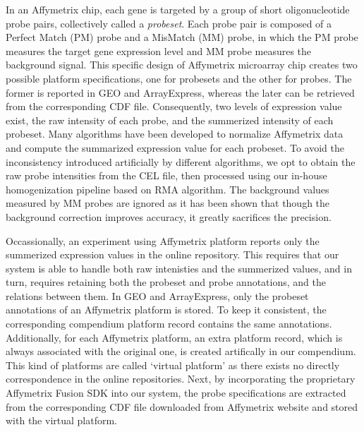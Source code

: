In an Affymetrix chip, each gene is targeted by a group of short
oligonucleotide probe pairs, collectively called a \textit{probeset}.
%
Each probe pair is composed of a Perfect Match (PM) probe and a MisMatch
(MM) probe, in which the PM probe measures the target gene expression
level and MM probe measures the background signal.
%
This specific design of Affymetrix microarray chip creates two possible
platform specifications, one for probesets and the other for probes.
%
The former is reported in GEO and ArrayExpress, whereas the later can be
retrieved from the corresponding CDF file.
%
Consequently, two levels of expression value exist, the raw intensity of
each probe, and the summerized intensity of each probeset.
%
Many algorithms \cite{Irizarry2003, Li2001, Hubbell2002} have been developed to
normalize Affymetrix data and compute the summarized expression value for each
probeset.
%
To avoid the inconsistency introduced artificially by different algorithms, we
opt to obtain the raw probe intensities from the CEL file, then processed
using our in-house homogenization pipeline based on RMA algorithm.
%
%
The background values measured by MM probes are ignored as it has been shown
that though the background correction improves accuracy, it greatly sacrifices
the precision\cite{Irizarry2006}.


Occassionally, an experiment using Affymetrix platform reports only the
summerized expression values in the online repository.
%
This requires that our system is able to handle both raw intenisties and the
summerized values, and in turn, requires retaining both the probeset and probe
annotations, and the relations between them.
%
In GEO and ArrayExpress, only the probeset annotations of an Affymetrix
platform is stored.
%
To keep it consistent, the corresponding compendium platform record contains
the same annotations.
%
Additionally, for each Affymetrix platform, an extra platform record, which is
always associated with the original one, is created artifically in our
compendium.
%
This kind of platforms are called `virtual platform' as there exists no
directly correspondence in the online repositories.
%
Next, by incorporating the proprietary Affymetrix Fusion SDK into our system,
the probe specifications are extracted from the corresponding CDF file
downloaded from Affymetrix website and stored with the virtual platform.
%


